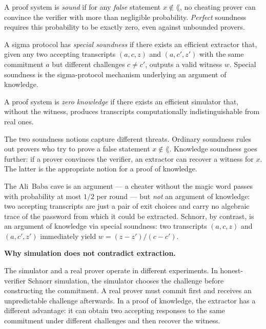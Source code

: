 \begin{definition}[Soundness]
A proof system is \emph{sound} if for any \emph{false} statement $x \notin \lang$, no cheating prover can convince the verifier with more than negligible probability.
\emph{Perfect} soundness requires this probability to be exactly zero, even against unbounded provers.
\end{definition}

\begin{definition}
A sigma protocol has \emph{special soundness} if there exists an efficient extractor that,
given any two accepting transcripts $(a,c,z)$ and $(a,c',z')$ with the same commitment $a$
but different challenges $c\neq c'$, outputs a valid witness $w$. Special soundness is the
sigma-protocol mechanism underlying an argument of knowledge.
\end{definition}

\begin{definition}
A proof system is \emph{zero knowledge} if there exists an efficient simulator that, without the witness, produces transcripts computationally indistinguishable from real ones.
\end{definition}

\begin{remark}
The two soundness notions capture different threats. Ordinary soundness rules out provers
who try to prove a false statement $x\notin\lang$. Knowledge soundness goes further: if a
prover convinces the verifier, an extractor can recover a witness for $x$. The latter is the
appropriate notion for a proof of knowledge.

The Ali~Baba cave is an argument --- a cheater without the magic word passes with probability at most $1/2$ per round --- but \emph{not} an argument of knowledge: two accepting transcripts are just a pair of exit choices and carry no algebraic trace of the password from which it could be extracted.
Schnorr, by contrast, is an argument of knowledge via special soundness: two transcripts $(a,c,z)$ and $(a,c',z')$ immediately yield $w = (z-z')/(c-c')$.
\end{remark}

\medskip
\textbf{Why simulation does not contradict extraction.}

The simulator and a real prover operate in different experiments. In honest-verifier Schnorr
simulation, the simulator chooses the challenge before constructing the commitment. A real
prover must commit first and receives an unpredictable challenge afterwards. In a proof of
knowledge, the extractor has a different advantage: it can obtain two accepting responses to
the same commitment under different challenges and then recover the witness.

